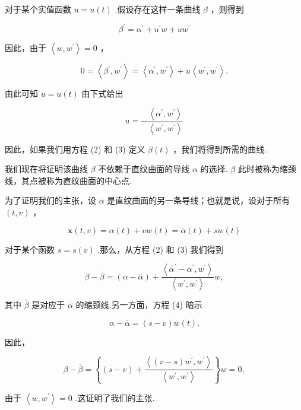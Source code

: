 对于某个实值函数 \(u = u\left( t\right)\) .假设存在这样一条曲线 \(\beta\) ，则得到

\[
{\beta }^{\prime } = {\alpha }^{\prime } + {u}^{\prime }w + u{w}^{\prime }
\]

因此，由于 \(\left\langle  {w,{w}^{\prime }}\right\rangle   = 0\) ，

\[
0 = \left\langle  {{\beta }^{\prime },{w}^{\prime }}\right\rangle   = \left\langle  {{\alpha }^{\prime },{w}^{\prime }}\right\rangle   + u\left\langle  {{w}^{\prime },{w}^{\prime }}\right\rangle  .
\]

由此可知 \(u = u\left( t\right)\) 由下式给出

\[
u =  - \frac{\left\langle  {\alpha }^{\prime },{w}^{\prime }\right\rangle  }{\left\langle  {w}^{\prime },{w}^{\prime }\right\rangle  } \tag{3}
\]

因此，如果我们用方程 (2) 和 (3) 定义 \(\beta \left( t\right)\) ，我们将得到所需的曲线.

我们现在将证明该曲线 \(\beta\) 不依赖于直纹曲面的导线 \(\alpha\) 的选择. \(\beta\) 此时被称为缩颈线，其点被称为直纹曲面的中心点.

为了证明我们的主张，设 \(\overline{\alpha }\) 是直纹曲面的另一条导线；也就是说，设对于所有 \(\left( {t,v}\right)\) ，

\[
\mathbf{x}\left( {t,v}\right)  = \alpha \left( t\right)  + {vw}\left( t\right)  = \overline{\alpha }\left( t\right)  + {sw}\left( t\right) \tag{4}
\]

对于某个函数 \(s = s\left( v\right)\) .那么，从方程 (2) 和 (3) 我们得到

\[
\beta  - \overline{\beta } = \left( {\alpha  - \overline{\alpha }}\right)  + \frac{\left\langle  {\overline{\alpha }}^{\prime } - {\alpha }^{\prime },{w}^{\prime }\right\rangle  }{\left\langle  {w}^{\prime },{w}^{\prime }\right\rangle  }w,
\]

其中 \(\overline{\beta }\) 是对应于 \(\overline{\alpha }\) 的缩颈线.另一方面，方程 (4) 暗示

\[
\alpha  - \overline{\alpha } = \left( {s - v}\right) w\left( t\right) .
\]

因此，

\[
\beta  - \overline{\beta } = \left\{  {\left( {s - v}\right)  + \frac{\left\langle  \left( v - s\right) {w}^{\prime },{w}^{\prime }\right\rangle  }{\left\langle  {w}^{\prime },{w}^{\prime }\right\rangle  }}\right\}  w = 0,
\]

由于 \(\left\langle  {w,{w}^{\prime }}\right\rangle   = 0\) .这证明了我们的主张.

